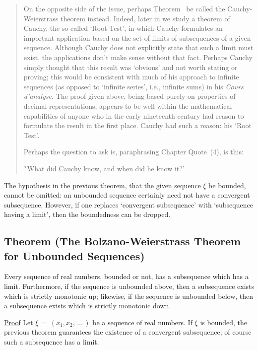 {\begin{quotation}
{        On the opposite side of the issue, perhaps Theorem~ be called the Cauchy-Weierstrass theorem instead.
    Indeed, later in {\ThisText} we study a theorem of Cauchy, the so-called `Root Test',
    in which Cauchy formulates an important application based on the set of limits of subsequences of a given sequence.
    Although Cauchy does not explicitly state that such a limit must exist, the applications don't make sense without that fact.
    Perhaps Cauchy simply thought that this result was `obvious' and not worth stating or proving;
    this would be consistent with much of his approach to infinite sequences (as opposed to `infinite series', i.e., infinite sums)
    in his {\em Cours d'analyse}. The proof given above, being based purely on properties of decimal representations,
    appears to be well within the mathematical capabilities of anyone who in the early nineteenth century had reason to formulate the result in the first place.
    Cauchy had such a reason: his `Root Test'.

        Perhaps the question to ask is, paraphrasing Chapter Quote~(4), is this:

        \h `What did Cauchy know, and when did he know it?'
}%
\end{quotation} 


\VV

        The hypothesis in the previous theorem, that the given sequence ${\xi}$ be bounded, cannot be omitted:
    an unbounded sequence certainly need not have a convergent subsequence. However,
    if one replaces `convergent subsequence' with `subsequence having a limit', then the boundedness can be dropped.

\V

            \subsection{\small{\bf Theorem} (The Bolzano-Weierstrass Theorem for Unbounded Sequences)}
            \label{ThmC30.10A}

\V

        Every sequence of real numbers, bounded or not, has a subsequence which has a limit.
    Furthermore, if the sequence is unbounded above, then a subsequence exists which is strictly monotonic up;
    likewise, if the sequence is unbounded below, then a subsequence exists which is strictly monotonic down.

\V

        \underline{Proof} Let ${\xi} \,=\, (x_{1}, x_{2},\,{\ldots}\,)$ be a sequence of real numbers.
    If ${\xi}$ is bounded, the previous theorem guarantees the existence of a convergent subsequence; of course such a subsequence has a limit.

}
